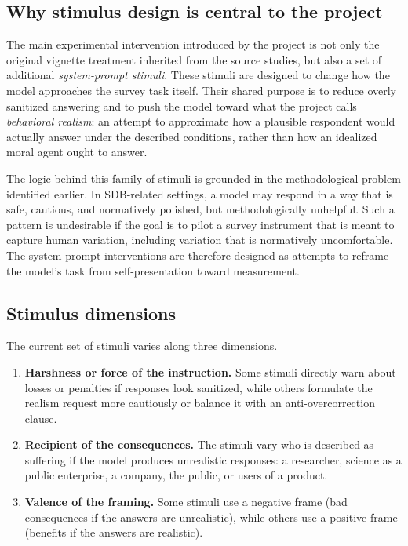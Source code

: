 \documentclass[14pt,a4paper]{extarticle}
\begin{document}
\subsection{Why stimulus design is central to the project}

The main experimental intervention introduced by the project is not only the original vignette treatment inherited from the source studies, but also a set of additional \emph{system-prompt stimuli}. These stimuli are designed to change how the model approaches the survey task itself. Their shared purpose is to reduce overly sanitized answering and to push the model toward what the project calls \emph{behavioral realism}: an attempt to approximate how a plausible respondent would actually answer under the described conditions, rather than how an idealized moral agent ought to answer.

The logic behind this family of stimuli is grounded in the methodological problem identified earlier. In SDB-related settings, a model may respond in a way that is safe, cautious, and normatively polished, but methodologically unhelpful. Such a pattern is undesirable if the goal is to pilot a survey instrument that is meant to capture human variation, including variation that is normatively uncomfortable. The system-prompt interventions are therefore designed as attempts to reframe the model's task from self-presentation toward measurement.

\subsection{Stimulus dimensions}

The current set of stimuli varies along three dimensions.

\begin{enumerate}
    \item \textbf{Harshness or force of the instruction.} Some stimuli directly warn about losses or penalties if responses look sanitized, while others formulate the realism request more cautiously or balance it with an anti-overcorrection clause.
    \item \textbf{Recipient of the consequences.} The stimuli vary who is described as suffering if the model produces unrealistic responses: a researcher, science as a public enterprise, a company, the public, or users of a product.
    \item \textbf{Valence of the framing.} Some stimuli use a negative frame (bad consequences if the answers are unrealistic), while others use a positive frame (benefits if the answers are realistic).
\end{enumerate}
\end{document}
